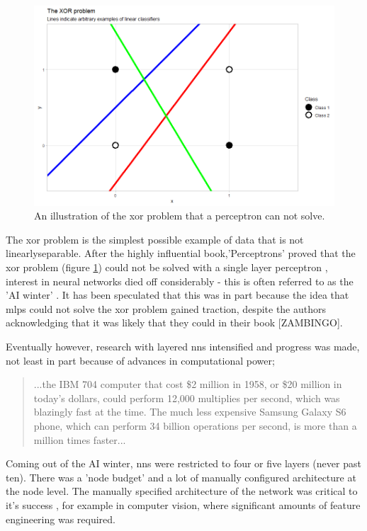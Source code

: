 \begin{figure}
    \centering
    \includegraphics[width=120mm]{figs/xor_problem.png}
    \caption{An illustration of the \gls{xor} problem that a perceptron can not solve.}
    \label{fig:xor_problem}
\end{figure}

The \gls{xor} problem is the simplest possible example of data that is not \gls{linearlyseparable}. After the highly influential book,'Perceptrons' proved that the \gls{xor} problem (figure \ref{fig:xor_problem}) could not be solved with a single layer perceptron \cite{perceptrons_book}, interest in neural networks died off considerably - this is often referred to as the 'AI winter' \cite{ai_winter}. It has been speculated \cite{ai_winter} that this was in part because the idea that \gls{mlp}s could not solve the \gls{xor} problem gained traction, despite the authors acknowledging that it was likely that they could in their book [ZAMBINGO]. \bigskip

Eventually however, research with layered \gls{nn}s intensified and progress was made, not least in part because of advances in computational power;

\begin{quote}
...the IBM 704 computer that cost \$2 million in 1958, or \$20 million in today’s dollars, could perform 12,000 multiplies per second, which was blazingly fast at the time. The much less expensive Samsung Galaxy S6 phone, which can perform 34 billion operations per second, is more than a million times faster...\cite{unreasonable_dl}
\end{quote}


\bigskip
Coming out of the AI winter, \gls{nn}s were restricted to four or five layers (never past ten). There was a 'node budget' and a lot of manually configured architecture at the node level. The manually specified architecture of the network was critical to it's success \cite{manual_architecture}, for example in computer vision, where significant amounts of feature engineering was required. 

